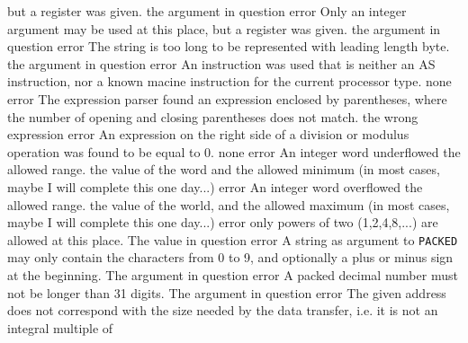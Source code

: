 \documentclass[12pt,twoside]{report}
\newcommand{\asname}{{AS}}
\begin{document}
\begin{description}
{                but a register was given.}
               {the argument in question}
               {error}
               {Only an integer argument may be used at this place,
                but a register was given.}
               {the argument in question}
               {error}
               {The string is too long to be represented with leading
                length byte.}
               {the argument in question}
               {error}
               {An instruction was used that is neither an \asname{} instruction, nor a
                known macine instruction for the current processor type.}
               {none}
               {error}
               {The expression parser found an expression enclosed by
                parentheses, where the number of opening and closing
                parentheses does not match.}
               {the wrong expression}
               {error}
               {An expression on the right side of a division or modulus
                operation was found to be equal to 0.}
               {none}
               {error}
               {An integer word underflowed the allowed range.}
               {the value of the word and the allowed minimum (in most
                cases, maybe I will complete this one day...)}
               {error}
               {An integer word overflowed the allowed range.}
               {the value of the world, and the allowed maximum (in most
                cases, maybe I will complete this one day...)}
               {error}
               {only powers of two (1,2,4,8,...) are allowed at this place.}
               {The value in question}
               {error}
               {A string as argument to {\tt PACKED} may only contain the
                characters from 0 to 9, and optionally a plus or minus
                sign at the beginning.}
               {The argument in question}
               {error}
               {A packed decimal number must not be longer than 31 digits.}
               {The argument in question}
               {error}
               {The given address does not correspond with the size needed
                by the data transfer, i.e. it is not an integral multiple of
}
\end{description}
\end{document}
